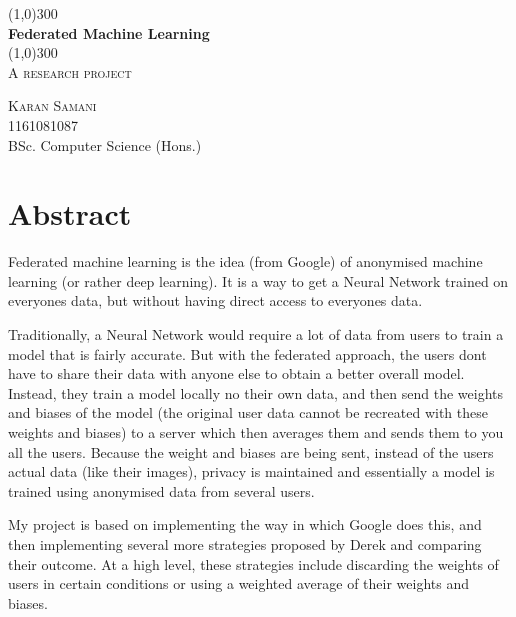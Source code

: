 \documentclass[10pt]{article}
\begin{document}
\makeatletter

\begin{titlepage}
	\begin{center}
		\line(1,0){300}\\
		[0.32cm]
		\huge{\bfseries Federated Machine Learning}\\
		[0.16cm]		
		\line(1,0){300}\\
		[0.64cm]		
		\textsc{\LARGE A research project}\\
		[10cm]
	\end{center}
	\begin{flushright}
		\textsc{\large Karan Samani}\\
		1161081087\\
		BSc. Computer Science (Hons.)\\
		\@date
	\end{flushright}
\end{titlepage}
\cleardoublepage

\section*{Abstract}
Federated machine learning is the idea (from Google) of anonymised machine learning (or rather deep learning). It is a way to get a Neural Network trained on everyones data, but without having direct access to everyones data.

Traditionally, a Neural Network would require a lot of data from users to train a model that is fairly accurate. But with the federated approach, the users dont have to share their data with anyone else to obtain a better overall model. Instead, they train a model locally no their own data, and then send the weights and biases of the model (the original user data cannot be recreated with these weights and biases) to a server which then averages them and sends them to you all the users. Because the weight and biases are being sent, instead of the users actual data (like their images), privacy is maintained and essentially a model is trained using anonymised data from several users.

My project is based on implementing the way in which Google does this, and then implementing several more strategies proposed by Derek and comparing their outcome. At a high level, these strategies include discarding the weights of users in certain conditions or using a weighted average of their weights and biases.\\
\clearpage
\end{document}
